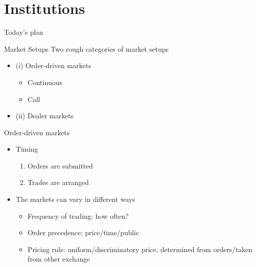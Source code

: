 \section{Institutions}

\begin{frame}{Today's plan}
\tableofcontents[currentsection]
\end{frame}




\begin{frame}{Market Setups}
Two rough categories of market setups
\begin{itemize}
	\item (i) Order-driven markets
	\begin{itemize}
		\item Continuous
		\item Call
	\end{itemize}
	\item (ii) Dealer markets
\end{itemize}
\end{frame}


\begin{frame}{Order-driven markets}
\begin{itemize}
	\item Timing
	\begin{enumerate}
		\item Orders are submitted
		\item Trades are arranged
	\end{enumerate}
	\item The markets can vary in different ways
	\begin{itemize}
		\item Frequency of trading: how often?
		\item Order precedence: price/time/public
		\item Pricing rule: uniform/discriminatory price, determined from orders/taken from other exchange
	\end{itemize}
\end{itemize}
\end{frame}


